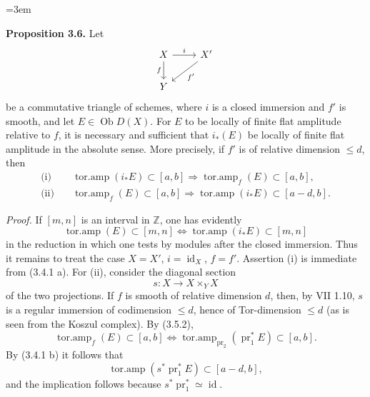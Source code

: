 \documentclass[11pt]{article}
\newcommand{\Spec}{\operatorname{Spec}}
\providecommand{\Coker}{\operatorname{Coker}}
\providecommand{\rank}{\operatorname{rank}}
\begin{document}
\providecommand{\Ob}{\operatorname{Ob}}
\providecommand{\D}{\mathrm D}
\providecommand{\Ho}{\mathrm H}
\providecommand{\RHom}{\mathrm R\!\operatorname{Hom}}
\providecommand{\parfamp}{\operatorname{parf.amp}}
\providecommand{\tamp}{\operatorname{tor.amp}}
\providecommand{\Qcoh}{\operatorname{Qcoh}}
\providecommand{\Mod}{\operatorname{Mod}}
\providecommand{\Coh}{\operatorname{Coh}}
\providecommand{\Lib}{\operatorname{Lib}}
\providecommand{\Loclib}{\operatorname{Loclib}}
\providecommand{\qcoh}{\mathrm{qcoh}}
\providecommand{\coh}{\mathrm{coh}}
\providecommand{\parf}{\mathrm{parf}}
\providecommand{\torf}{\mathrm{torf}}
\providecommand{\id}{\operatorname{id}}
\providecommand{\Coker}{\operatorname{Coker}}
\providecommand{\rank}{\operatorname{rank}}
\providecommand{\rg}{\operatorname{rg}}
\providecommand{\Hom}{\operatorname{Hom}}
\providecommand{\Ext}{\operatorname{Ext}}
\providecommand{\Spec}{\operatorname{Spec}}
\providecommand{\Cone}{\operatorname{Cone}}
\providecommand{\pt}{\operatorname{Pt}}
\providecommand{\ind}{\operatorname{ind}}
\hfuzz=20pt
\emergencystretch=3em

\textbf{Proposition 3.6.} Let
\[
\begin{tikzcd}
X \arrow[r,"i"] \arrow[d,"f"'] & X' \arrow[dl,"f'"]\\
Y &
\end{tikzcd}
\]
be a commutative triangle of schemes, where \(i\) is a closed immersion and \(f'\) is smooth, and let \(E\in\Ob D(X)\). For \(E\) to be locally of finite flat amplitude relative to \(f\), it is necessary and sufficient that \(i_*(E)\) be locally of finite flat amplitude in the absolute sense. More precisely, if \(f'\) is of relative dimension \(\leq d\), then
\begin{align*}
\text{(i)}\quad &\tamp(i_*E)\subset[a,b] \Longrightarrow \tamp_f(E)\subset[a,b],\\
\text{(ii)}\quad &\tamp_f(E)\subset[a,b] \Longrightarrow \tamp(i_*E)\subset[a-d,b].
\end{align*}

\emph{Proof.} If \([m,n]\) is an interval in \(\mathbb Z\), one has evidently
\[
 \tamp(E)\subset[m,n] \Longleftrightarrow \tamp(i_*E)\subset[m,n]
\]
in the reduction in which one tests by modules after the closed immersion. Thus it remains to treat the case \(X=X'\), \(i=\id_X\), \(f=f'\). Assertion (i) is immediate from (3.4.1 a). For (ii), consider the diagonal section
\[
 s:X\longrightarrow X\times_YX
\]
of the two projections. If \(f\) is smooth of relative dimension \(d\), then, by VII 1.10, \(s\) is a regular immersion of codimension \(\leq d\), hence of Tor-dimension \(\leq d\) (as is seen from the Koszul complex). By (3.5.2),
\[
 \tamp_f(E)\subset[a,b]
 \Longleftrightarrow
 \tamp_{\operatorname{pr}_2}(\operatorname{pr}_1^*E)\subset[a,b].
\]
By (3.4.1 b) it follows that
\[
 \tamp(s^*\operatorname{pr}_1^*E)
 \subset[a-d,b],
\]
and the implication follows because \(s^*\operatorname{pr}_1^*\simeq\id\).
\end{document}
